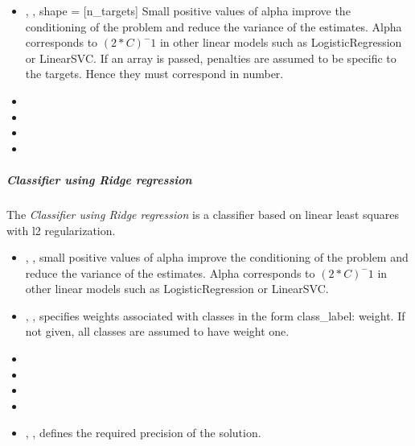 %
\begin{itemize}
  \item {}, ,
  shape = [n\_targets] Small positive values of alpha improve the
  conditioning of the problem and reduce the variance of the estimates.
  Alpha corresponds to $(2*C)^-1$ in other linear models such as
  LogisticRegression or LinearSVC.
  If an array is passed, penalties are assumed to be specific to the targets.
  Hence they must correspond in number.
  \item {}
  \item {}
  \item {}
  \item \solverDescription
\end{itemize}

\subparagraph{Classifier using Ridge regression}
\mbox{}

The \textit{Classifier using Ridge regression} is a classifier based on linear
least squares with l2 regularization.

\begin{itemize}
  \item {}, , small positive values of alpha improve
  the conditioning of the problem and reduce the variance of the estimates.
  Alpha corresponds to $(2*C)^-1$ in other linear models such as
  LogisticRegression or LinearSVC.
  \item {}, , specifies
  weights associated with classes in the form {class\_label: weight}.
  If not given, all classes are assumed to have weight one.
  \item {}
  \item {}
  \item {}
  \item \solverDescription
  \item {}, , defines the required precision of the
  solution.
\end{itemize}

